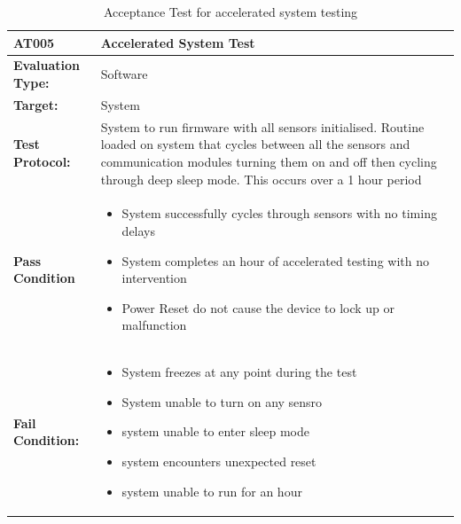 \begin{table}[H]
    \centering
    \caption{Acceptance Test for accelerated system testing}
    \begin{tabular}{|m{}|m{}|}
    \hline
   \textbf{AT005 }& \textbf{Accelerated System Test} \\
     \hline
    \textbf{Evaluation Type:} & Software \\
     \hline
    \textbf{Target: } & System \\
    \hline
    \textbf{Test Protocol:} &  System to run firmware with all sensors initialised. Routine loaded on system that cycles between all the sensors and communication modules turning them on and off then cycling through deep sleep mode. This occurs over a 1 hour period\\
    \hline
    \textbf{Pass Condition} & \vspace{5pt} \begin{itemize}
        \item System successfully cycles through sensors with no timing delays
        \item System completes an hour of accelerated testing with no intervention
        \item Power Reset do not cause the device to lock up or malfunction
    \end{itemize} \\
    \hline
    \textbf{Fail Condition:} & \vspace{5pt} \begin{itemize}
        \item System freezes at any point during the test 
        \item System unable to turn on any sensro
        \item system unable to enter sleep mode
        \item system encounters unexpected reset
        \item system unable to run for an hour
        \end{itemize}\\
        \hline
    \end{tabular}

    \label{tab:AT005}
\end{table}

